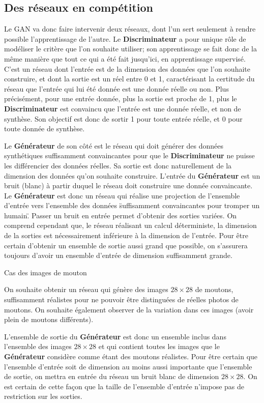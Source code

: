 \subsection{Des réseaux en compétition}

Le GAN va donc faire intervenir deux réseaux, dont l'un sert seulement à rendre possible l'apprentissage de l'autre. Le \textbf{Discriminateur} a pour unique rôle de modéliser le critère que l'on souhaite utiliser; son apprentissage se fait donc de la même manière que tout ce qui a été fait jusqu'ici, en apprentissage supervisé. C'est un réseau dont l'entrée est de la dimension des données que l'on souhaite construire, et dont la sortie est un réel entre 0 et 1, caractérisant la certitude du réseau que l'entrée qui lui été donnée est une donnée réelle ou non. Plus précisément, pour une entrée donnée, plus la sortie est proche de 1, plus le \textbf{Discriminateur} est convaincu que l'entrée est une donnée réelle, et non de synthèse. Son objectif est donc de sortir 1 pour toute entrée réelle, et 0 pour toute donnée de synthèse.

Le \textbf{Générateur} de son côté est le réseau qui doit générer des données synthétiques suffisamment convaincantes pour que le \textbf{Discriminateur} ne puisse les différencier des données réelles. Sa sortie est donc naturellement de la dimension des données qu'on souhaite construire. L'entrée du \textbf{Générateur} est un bruit (blanc) à partir duquel le réseau doit construire une donnée convaincante. Le \textbf{Générateur} est donc un réseau qui réalise une projection de l'ensemble d'entrée vers l'ensemble des données \"suffisamment convaincantes pour tromper un humain\". Passer un bruit en entrée permet d'obtenir des sorties variées. On comprend cependant que, le réseau réalisant un calcul déterministe, la dimension de la sorties est nécessairement inférieure à la dimension de l'entrée. Pour être certain d'obtenir un ensemble de sortie aussi grand que possible, on s'assurera toujours d'avoir un ensemble d'entrée de dimension suffisamment grande. \\

\begin{example} Cas des images de mouton

On souhaite obtenir un réseau qui génère des images $28 \times 28$ de moutons, suffisamment réalistes pour ne pouvoir être distinguées de réelles photos de moutons. On souhaite également observer de la variation dans ces images (avoir plein de moutons différents). 

L'ensemble de sortie du \textbf{Générateur} est donc un ensemble inclus dans l'ensemble des images $28 \times 28$ et qui contient toutes les images que le \textbf{Générateur} considère comme étant des moutons réalistes. Pour être certain que l'ensemble d'entrée soit de dimension au moins aussi importante que l'ensemble de sortie, on mettra en entrée du réseau un bruit blanc de dimension $28 \times 28$. On est certain de cette façon que la taille de l'ensemble d'entrée n'impose pas de restriction sur les sorties. \\
\end{example}

